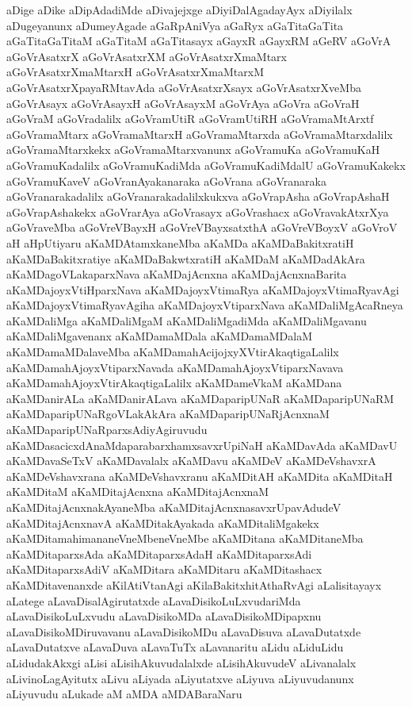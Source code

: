 {aDige
aDike
aDipAdadiMde
aDivajejxge
aDiyiDalAgadayAyx
aDiyilalx
aDugeyanunx
aDumeyAgade
aGaRpAniVya
aGaRyx
aGaTitaGaTita
aGaTitaGaTitaM
aGaTitaM
aGaTitasayx
aGayxR
aGayxRM
aGeRV
aGoVrA
aGoVrAsatxrX
aGoVrAsatxrXM
aGoVrAsatxrXmaMtarx
aGoVrAsatxrXmaMtarxH
aGoVrAsatxrXmaMtarxM
aGoVrAsatxrXpayaRMtavAda
aGoVrAsatxrXsayx
aGoVrAsatxrXveMba
aGoVrAsayx
aGoVrAsayxH
aGoVrAsayxM
aGoVrAya
aGoVra
aGoVraH
aGoVraM
aGoVradalilx
aGoVramUtiR
aGoVramUtiRH
aGoVramaMtArxtf
aGoVramaMtarx
aGoVramaMtarxH
aGoVramaMtarxda
aGoVramaMtarxdalilx
aGoVramaMtarxkekx
aGoVramaMtarxvanunx
aGoVramuKa
aGoVramuKaH
aGoVramuKadalilx
aGoVramuKadiMda
aGoVramuKadiMdalU
aGoVramuKakekx
aGoVramuKaveV
aGoVranAyakanaraka
aGoVrana
aGoVranaraka
aGoVranarakadalilx
aGoVranarakadalilxkukxva
aGoVrapAsha
aGoVrapAshaH
aGoVrapAshakekx
aGoVrarAya
aGoVrasayx
aGoVrashacx
aGoVravakAtxrXya
aGoVraveMba
aGoVreVBayxH
aGoVreVBayxsatxthA
aGoVreVBoyxV
aGoVroV
aH
aHpUtiyaru
aKaMDAtamxkaneMba
aKaMDa
aKaMDaBakitxratiH
aKaMDaBakitxratiye
aKaMDaBakwtxratiH
aKaMDaM
aKaMDadAkAra
aKaMDagoVLakaparxNava
aKaMDajAcnxna
aKaMDajAcnxnaBarita
aKaMDajoyxVtiHparxNava
aKaMDajoyxVtimaRya
aKaMDajoyxVtimaRyavAgi
aKaMDajoyxVtimaRyavAgiha
aKaMDajoyxVtiparxNava
aKaMDaliMgAcaRneya
aKaMDaliMga
aKaMDaliMgaM
aKaMDaliMgadiMda
aKaMDaliMgavanu
aKaMDaliMgavenanx
aKaMDamaMDala
aKaMDamaMDalaM
aKaMDamaMDalaveMba
aKaMDamahAcijojxyXVtirAkaqtigaLalilx
aKaMDamahAjoyxVtiparxNavada
aKaMDamahAjoyxVtiparxNavava
aKaMDamahAjoyxVtirAkaqtigaLalilx
aKaMDameVkaM
aKaMDana
aKaMDanirALa
aKaMDanirALava
aKaMDaparipUNaR
aKaMDaparipUNaRM
aKaMDaparipUNaRgoVLakAkAra
aKaMDaparipUNaRjAcnxnaM
aKaMDaparipUNaRparxsAdiyAgiruvudu
aKaMDasacicxdAnaMdaparabarxhamxsavxrUpiNaH
aKaMDavAda
aKaMDavU
aKaMDavaSeTxV
aKaMDavalalx
aKaMDavu
aKaMDeV
aKaMDeVshavxrA
aKaMDeVshavxrana
aKaMDeVshavxranu
aKaMDitAH
aKaMDita
aKaMDitaH
aKaMDitaM
aKaMDitajAcnxna
aKaMDitajAcnxnaM
aKaMDitajAcnxnakAyaneMba
aKaMDitajAcnxnasavxrUpavAdudeV
aKaMDitajAcnxnavA
aKaMDitakAyakada
aKaMDitaliMgakekx
aKaMDitamahimananeVneMbeneVneMbe
aKaMDitana
aKaMDitaneMba
aKaMDitaparxsAda
aKaMDitaparxsAdaH
aKaMDitaparxsAdi
aKaMDitaparxsAdiV
aKaMDitara
aKaMDitaru
aKaMDitashacx
aKaMDitavenanxde
aKilAtiVtanAgi
aKilaBakitxhitAthaRvAgi
aLalisitayayx
aLatege
aLavaDisalAgirutatxde
aLavaDisikoLuLxvudariMda
aLavaDisikoLuLxvudu
aLavaDisikoMDa
aLavaDisikoMDipapxnu
aLavaDisikoMDiruvavanu
aLavaDisikoMDu
aLavaDisuva
aLavaDutatxde
aLavaDutatxve
aLavaDuva
aLavaTuTx
aLavanaritu
aLidu
aLiduLidu
aLidudakAkxgi
aLisi
aLisihAkuvudalalxde
aLisihAkuvudeV
aLivanalalx
aLivinoLagAyitutx
aLivu
aLiyada
aLiyutatxve
aLiyuva
aLiyuvudanunx
aLiyuvudu
aLukade
aM
aMDA
aMDABaraNaru
}
